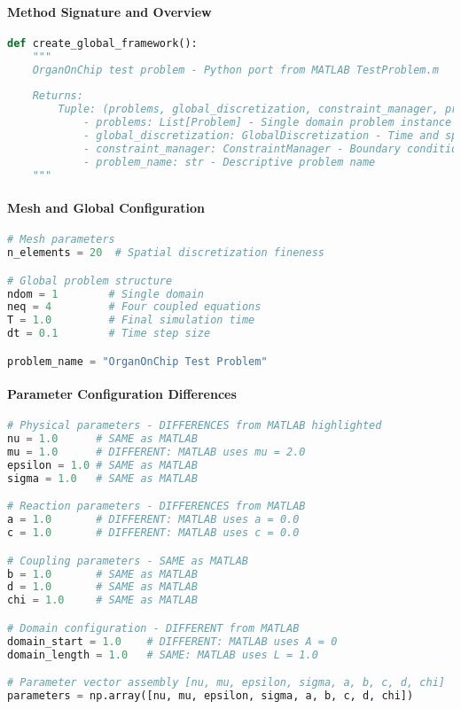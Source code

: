 \paragraph{Method Signature and Overview}
\begin{lstlisting}[language=Python, caption=create\_global\_framework Method Signature]
def create_global_framework():
    """
    OrganOnChip test problem - Python port from MATLAB TestProblem.m
    
    Returns:
        Tuple: (problems, global_discretization, constraint_manager, problem_name)
            - problems: List[Problem] - Single domain problem instance
            - global_discretization: GlobalDiscretization - Time and space discretization
            - constraint_manager: ConstraintManager - Boundary condition manager
            - problem_name: str - Descriptive problem name
    """
\end{lstlisting}

\paragraph{Mesh and Global Configuration}
\begin{lstlisting}[language=Python, caption=Python Global Configuration]
# Mesh parameters
n_elements = 20  # Spatial discretization fineness

# Global problem structure  
ndom = 1        # Single domain
neq = 4         # Four coupled equations
T = 1.0         # Final simulation time
dt = 0.1        # Time step size

problem_name = "OrganOnChip Test Problem"
\end{lstlisting}

\paragraph{Parameter Configuration Differences}
\begin{lstlisting}[language=Python, caption=Python Parameter Setup vs MATLAB]
# Physical parameters - DIFFERENCES from MATLAB highlighted
nu = 1.0      # SAME as MATLAB
mu = 1.0      # DIFFERENT: MATLAB uses mu = 2.0
epsilon = 1.0 # SAME as MATLAB  
sigma = 1.0   # SAME as MATLAB

# Reaction parameters - DIFFERENCES from MATLAB
a = 1.0       # DIFFERENT: MATLAB uses a = 0.0
c = 1.0       # DIFFERENT: MATLAB uses c = 0.0

# Coupling parameters - SAME as MATLAB
b = 1.0       # SAME as MATLAB
d = 1.0       # SAME as MATLAB  
chi = 1.0     # SAME as MATLAB

# Domain configuration - DIFFERENT from MATLAB
domain_start = 1.0    # DIFFERENT: MATLAB uses A = 0
domain_length = 1.0   # SAME: MATLAB uses L = 1.0

# Parameter vector assembly [nu, mu, epsilon, sigma, a, b, c, d, chi]
parameters = np.array([nu, mu, epsilon, sigma, a, b, c, d, chi])
\end{lstlisting}

